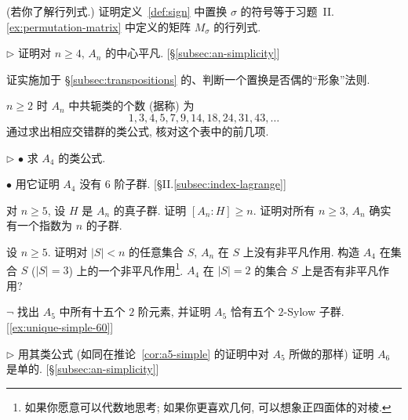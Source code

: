 \begin{prob}
\label{ex:sign-determinant}
(若你了解行列式.) 证明定义~\ref{def:sign} 中置换 $\sigma$ 的符号等于习题~II.\ref{ex:permutation-matrix} 中定义的矩阵 $M_\sigma$ 的行列式.
\end{prob}

\begin{prob}
\label{ex:center-an}
$\triangleright$ 证明对 $n \geq 4$, $A_n$ 的中心平凡. [§\ref{subsec:an-simplicity}]
\end{prob}

\begin{prob}
\label{ex:even-pictorial}
证实施加于 \S\ref{subsec:transpositions} 的、判断一个置换是否偶的``形象''法则.
\end{prob}

\begin{prob}
\label{ex:an-conj-classes-list}
$n \geq 2$ 时 $A_n$ 中共轭类的个数 (据称) 为
\[
1, 3, 4, 5, 7, 9, 14, 18, 24, 31, 43, \dots
\]
通过求出相应交错群的类公式, 核对这个表中的前几项.
\end{prob}

\begin{prob}
\label{ex:a4-class-formula}
$\triangleright$ $\bullet$ 求 $A_4$ 的类公式.

$\bullet$ 用它证明 $A_4$ 没有 $6$ 阶子群. [§II.\ref{subsec:index-lagrange}]
\end{prob}

\begin{prob}
\label{ex:an-index-n}
对 $n \geq 5$, 设 $H$ 是 $A_n$ 的真子群. 证明 $[A_n : H] \geq n$. 证明对所有 $n \geq 3$, $A_n$ 确实有一个指数为 $n$ 的子群.
\end{prob}

\begin{prob}
\label{ex:an-no-small-action}
设 $n\geq5$. 证明对 $|S| < n$ 的任意集合 $S$, $A_n$ 在 $S$ 上没有非平凡作用. 构造 $A_4$ 在集合 $S$ ($|S| = 3$) 上的一个非平凡作用\footnote{如果你愿意可以代数地思考; 如果你更喜欢几何, 可以想象正四面体的对棱.}. $A_4$ 在 $|S| = 2$ 的集合 $S$ 上是否有非平凡作用?
\end{prob}

\begin{prob}
\label{ex:a5-sylow-5}
$\neg$ 找出 $A_5$ 中所有十五个 $2$ 阶元素, 并证明 $A_5$ 恰有五个 $2$-Sylow 子群. [\ref{ex:unique-simple-60}]
\end{prob}

\begin{prob}
\label{ex:a6-simple}
$\triangleright$ 用其类公式 (如同在推论~\ref{cor:a5-simple} 的证明中对 $A_5$ 所做的那样) 证明 $A_6$ 是单的. [§\ref{subsec:an-simplicity}]
\end{prob}

